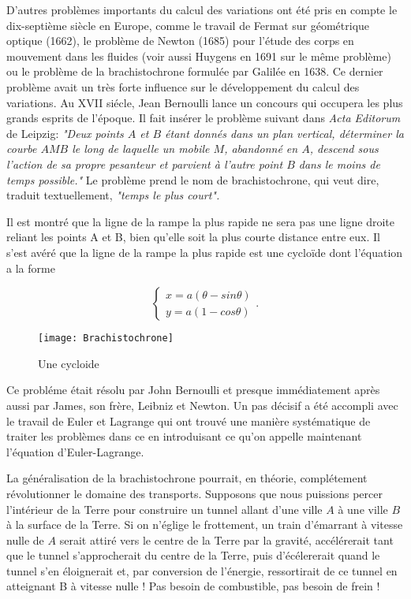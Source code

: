 \documentclass[10pt,a4paper]{article}%
\theoremstyle{theorem}
\theoremstyle{definition}
\begin{document}
	
	D'autres problèmes importants du calcul des variations ont été pris en compte le dix-septième siècle en Europe, comme le travail de Fermat sur géométrique optique (1662), le problème de Newton (1685) pour l'étude des corps en mouvement dans les fluides (voir aussi Huygens en 1691 sur le même problème) ou le problème de la brachistochrone formulée par Galilée en 1638. Ce dernier problème avait un très forte influence sur le développement du calcul des variations.  Au XVII siécle, Jean Bernoulli lance un concours qui occupera les plus grands esprits de l'époque. Il fait insérer le problème suivant dans \textit{Acta Editorum} de Leipzig: \textit{"Deux points $A$ et $B$ étant donnés dans un plan vertical, déterminer la courbe $AMB$ le long de laquelle un mobile $M$, abandonné en $A$, descend sous l'action de sa propre pesanteur et parvient à l'autre point $B$ dans le moins de temps possible."} Le problème prend le nom de brachistochrone, qui veut dire, traduit textuellement, \textit{"temps le plus court".} 
	
	Il est montré que la ligne de la rampe la plus rapide ne sera pas une ligne droite reliant les points A et B, bien qu'elle soit la plus courte distance entre eux. Il s'est avéré que la ligne de la rampe la plus rapide est une cycloïde dont l'équation a la forme
		 	
	\begin{equation*}
	 	\begin{cases}
		 	x=a(\theta-sin\theta)
		 	\\
	 		y=a(1-cos\theta)
	 	\end{cases}.
 	\end{equation*}
 	
 	\begin{figure}[h]
 	
 		\begin{center}
 			\texttt{[image: Brachistochrone]}
 		\end{center}
 	\caption{Une cycloide}\label{brach.figure}
 	\end{figure}
 	
 	
 	Ce probléme était résolu par John Bernoulli et presque immédiatement après aussi par James, son frère, Leibniz et Newton. Un pas décisif a été accompli avec le travail de Euler et Lagrange qui ont trouvé une manière systématique de traiter les problèmes dans ce en introduisant ce qu'on appelle maintenant l'équation d'Euler-Lagrange. 
 	
 	La généralisation de la brachistochrone pourrait, en théorie, complétement révolutionner le domaine des transports. Supposons que nous puissions percer l’intérieur de la Terre pour construire un tunnel allant d’une ville $A$ à une ville $B$ à la surface de la Terre. Si on n'églige le frottement, un train d'émarrant à vitesse nulle de $A$ serait attiré vers le centre de la Terre par la gravité, accélérerait tant que le tunnel s'approcherait du centre de la Terre, puis d'écélererait quand le tunnel s'en éloignerait et, par conversion de l'énergie, ressortirait de ce tunnel en atteignant B à vitesse nulle ! Pas besoin de combustible, pas besoin de frein ! 	
	 
\end{document}
